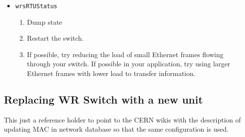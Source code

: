 \begin{itemize}
  \item \texttt{wrsRTUStatus}
    \begin{enumerate}
      \item Dump state
      \item Restart the switch.
      \item If possible, try reducing the load of small Ethernet frames flowing
        through your switch. If possible in your application, try using larger
        Ethernet frames with lower load to transfer information.
    \end{enumerate}
\end{itemize}

\subsection{Replacing WR Switch with a new unit}
\label{cern:wrs_replacement}
This just a reference holder to point to the CERN wikis with the description of
updating MAC in network database so that the same configuration is used.
